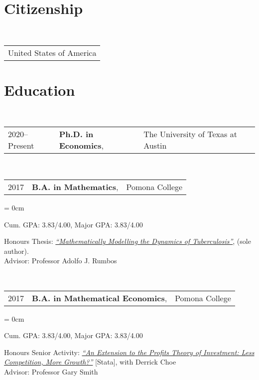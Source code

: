 \documentclass[a4paper, 11pt]{article}
\begin{document}
    \maketitle
    \thispagestyle{firststyle}
    \section{Citizenship}
      ~\begin{tabular}{l}
        United States of America\\
      \end{tabular}
    \section{Education}
      ~\begin{tabular}{lll}
        2020--Present & \textbf{Ph.D. in Economics}, & The University of Texas at Austin\\
      \end{tabular}
      \vspace*{1em}
      ~\begin{tabular}{lll}
        2017 & \textbf{B.A. in Mathematics}, & Pomona College\\
      \end{tabular}
    \begin{compactitem}\parskip = 0cm
      \item Cum. GPA: 3.83/4.00, Major GPA: 3.83/4.00\\
      \item Honours Thesis: \textit{\href{https://drive.google.com/file/d/0B1o_SCwTPL6TaEZuZ0ZBdXhlRms/view?usp=sharing}{``Mathematically Modelling the Dynamics of Tuberculosis''}}, (sole author).\\
      Advisor: Professor Adolfo J. Rumbos
    \end{compactitem}
    \vspace*{1em}
    ~\begin{tabular}{lll}
      2017 & \textbf{B.A. in Mathematical Economics}, & Pomona College\\
    \end{tabular}
    \begin{compactitem}\parskip = 0cm
      \item Cum. GPA: 3.83/4.00, Major GPA: 3.83/4.00\\
      \item Honours Senior Activity: \textit{\href{https://drive.google.com/file/d/0B1o_SCwTPL6TRzI3clFtbGdiVk0/view?usp=sharing}{``An Extension to the Profits Theory of Investment: Less Competition, More Growth?''}} {[Stata]}, with Derrick Choe\\
      Advisor: Professor Gary Smith
    \end{compactitem}
\end{document}
